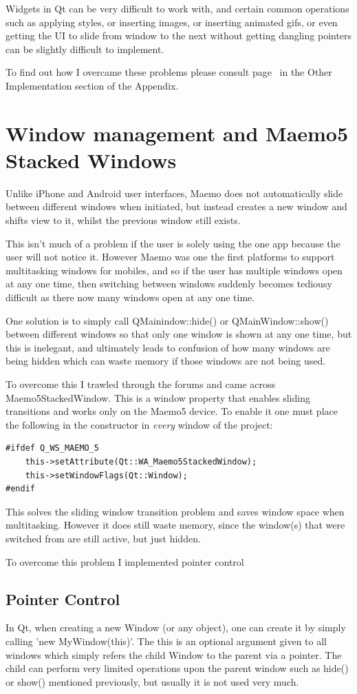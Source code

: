 Widgets in Qt can be very difficult to work with, and certain common operations such as applying styles, or inserting images, or inserting animated gifs, or even getting the UI to slide from window to the next without getting dangling pointers can be slightly difficult to implement.

To find out how I overcame these problems please consult page~\pageref{widgetstuff} in the Other Implementation section of the Appendix.

\section{Window management and Maemo5 Stacked Windows}
Unlike iPhone and Android user interfaces, Maemo does not automatically slide between different windows when initiated, but instead creates a new window and shifts view to it, whilst the previous window still exists. 

This isn't much of a problem if the user is solely using the one app because the user will not notice it. However Maemo was one the first platforms to support multitasking windows for mobiles, and so if the user has multiple windows open at any one time, then switching between windows suddenly becomes tediousy difficult as there now many windows open at any one time.

One solution is to simply call QMainindow::hide() or QMainWindow::show() between different windows so that only one window is shown at any one time, but this is inelegant, and ultimately leads to confusion of how many windows are being hidden which can waste memory if those windows are not being used.

To overcome this I trawled through the forums and came across Maemo5StackedWindow. This is a window property that enables sliding transitions and works only on the Maemo5 device. To enable it one must place the following in the constructor in {\it every} window of the project:
\begin{lstlisting}
#ifdef Q_WS_MAEMO_5
    this->setAttribute(Qt::WA_Maemo5StackedWindow);
    this->setWindowFlags(Qt::Window);
#endif
\end{lstlisting}

This solves the sliding window transition problem and saves window space when multitasking. However it does still waste memory, since the window(s) that were switched from are still active, but just hidden.

To overcome this problem I implemented pointer control
\subsection{Pointer Control}
In Qt, when creating a new Window (or any object), one can create it by simply calling 'new MyWindow(this)'. The this is an optional argument given to all windows which simply refers the child Window to the parent via a pointer. The child can perform very limited operations upon the parent window such as hide() or show() mentioned previously, but usually it is not used very much.


